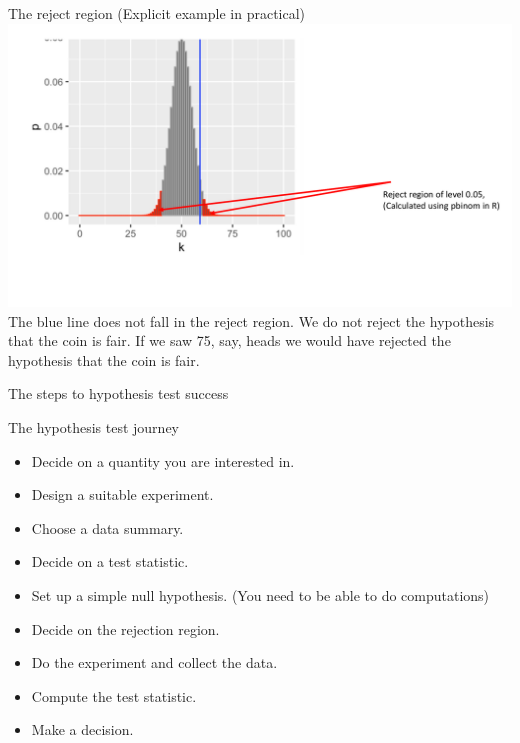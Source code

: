 \documentclass{bredelebeamer}
\begin{document}
\begin{frame}{The reject region}
(Explicit example in practical)
\includegraphics[width=1\textwidth]{rejectregion}
The blue line does not fall in the reject region. We do not reject the hypothesis that the coin is fair. If we saw 75, say, heads we would have rejected the hypothesis that the coin is fair.
\end{frame}


\begin{frame}{The steps to hypothesis test success }
\begin{block}{The hypothesis test journey}
	
	\begin{itemize}
		\item Decide on a quantity you are interested in.
		
		\item Design a suitable experiment.
		
		\item Choose a data summary. 
		
		\item Decide on a test statistic.
		
		\item Set up a simple null hypothesis. (You need to be able to do computations)
		
		\item Decide on the rejection region.
		
		\item Do the experiment and collect the data.
		
		\item Compute the test statistic.
		
		\item Make a decision.
	\end{itemize}

\end{block}
\end{frame}
\end{document}
